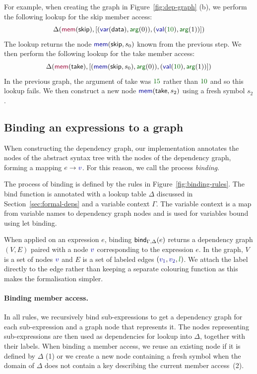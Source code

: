 \documentclass[sigplan,10pt]{acmart}\settopmatter{printfolios=true,printccs=false,printacmref=false}
\theoremstyle{plain}
\theoremstyle{definition}
\newcommand{\num}[1]{\textcolor{numclr}{#1}}
\newcommand{\ident}[1]{\textnormal{\sffamily #1}}
\newcommand{\kvd}[1]{\textnormal{\textcolor{kvdclr}{\sffamily #1}}}
\newcommand{\bndclr}[1]{\textcolor{kvdclr}{#1}}
\newcommand{\blblclr}[1]{\textcolor{numclr}{#1}}
\newcommand{\bnd}[1]{\textnormal{\textcolor{kvdclr}{\sffamily #1}}}
\newcommand{\bknd}[1]{\textnormal{\textcolor{prepclr}{\sffamily #1}}}
\newcommand{\blbl}[1]{\textnormal{\textcolor{numclr}{\sffamily #1}}}
\begin{document}
For example, when creating the graph in Figure~\ref{fig:dep-graph} (b), we perform the following
lookup for the \ident{skip} member access:
%
\[ \Delta(\bknd{mem}(\ident{skip}), [(\bnd{var}(\ident{data}),\blbl{arg}(0)), (\bnd{val}(\num{10}), \blbl{arg}(1))]) \]
%
The lookup returns the node $\bnd{mem}(\ident{skip}, s_0)$ known from the previous step. We then perform
the following lookup for the \ident{take} member access:
%
\[ \Delta(\bknd{mem}(\ident{take}), [(\bnd{mem}(\ident{skip}, s_0),\blbl{arg}(0)), (\bnd{val}(\num{10}), \blbl{arg}(1))]) \]
%
In the previous graph, the argument of \ident{take} was $\num{15}$ rather than $\num{10}$ and so
this lookup fails. We then construct a new node $\bnd{mem}(\ident{take}, s_2)$ using a fresh
symbol $s_2$.


\subsection{Binding an expressions to a graph}
\label{sec:formal-bind}

When constructing the dependency graph, our implementation annotates the nodes of the 
abstract syntax tree with the nodes of the dependency graph, forming a mapping
$e \rightarrow \bndclr{v}$. For this reason, we call the process \emph{binding}.

The process of binding is defined by the rules in Figure~\ref{fig:binding-rules}.
The \ident{bind} function is annotated with a lookup table $\Delta$ discussed in 
Section~\ref{sec:formal-deps} and a variable context $\Gamma$. The variable context 
is a map from variable names to dependency graph nodes and is used for variables bound
using \kvd{let} binding.

When applied on an expression $e$, binding $\ident{bind}_{\Gamma,\Delta}(e)$ returns a
dependency graph $(V, E)$ paired with a node $\bndclr{v}$ corresponding to the expression $e$.
In the graph, $V$ is a set of nodes $\bndclr{v}$ and $E$ is a set of labeled edges
$(\bndclr{v_1}, \bndclr{v_2}, \blblclr{l})$. We attach the label directly to the edge rather than
keeping a separate colouring function as this makes the formalisation simpler.

\paragraph{Binding member access.} In all rules, we recursively bind sub-expressions to get
a dependency graph for each sub-expression and a graph node that represents it. The nodes 
representing sub-expressions are then used as dependencies for lookup into $\Delta$, together
with their labels. When binding a member access, we reuse an existing node if it is defined by 
$\Delta$ (1) or we create a new node containing a fresh symbol when the domain of $\Delta$ does 
not contain a key describing the current member access~(2). 
\end{document}

